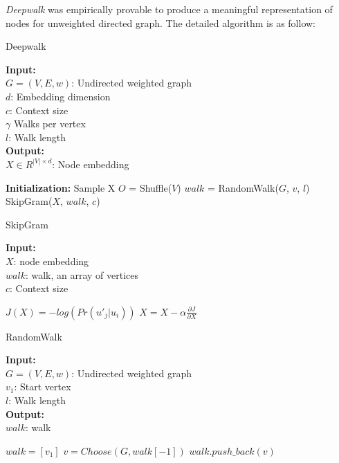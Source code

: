\emph{Deepwalk} \cite{perozzi2014deepwalk} was empirically provable to produce a meaningful representation of nodes for unweighted directed graph. The detailed algorithm is as follow:

\begin{algorithm}[H]
\caption{Deepwalk}
\textbf{Input:}\\
    $G = (V, E, w)$: Undirected weighted graph \\
    $d$: Embedding dimension \\
    $c$: Context size \\
    $\gamma$ Walks per vertex\\
    $l$: Walk length\\

\textbf{Output:}\\
    $X \in R^{|V| \times d}$: Node embedding\\

\begin{algorithmic}
\State \textbf{Initialization:} Sample X
    \State $O$ = Shuffle($V$)
        \State $walk$ = RandomWalk($G$, $v$, $l$)
        \State SkipGram($X$, $walk$, $c$)
    \EndFor
\EndFor
\end{algorithmic}
\end{algorithm}

\begin{algorithm}[H]
\caption{SkipGram}
\textbf{Input:}\\
    $X$: node embedding \\
    $walk$: walk, an array of vertices \\
    $c$: Context size \\

\begin{algorithmic}
 
     
        \State $J(X) = -log(Pr(u'_j | u_i))$
        \State $X = X - \alpha \frac{\partial J}{\partial X}$
        
    \EndFor
\EndFor
\end{algorithmic}
\end{algorithm}

\begin{algorithm}[H]
\caption{RandomWalk}
\textbf{Input:}\\
    $G = (V, E, w)$: Undirected weighted graph \\
    $v_1$: Start vertex \\
    $l$: Walk length\\

\textbf{Output:}\\
    $walk$: walk\\

\begin{algorithmic}
\State $walk = [v_1]$
    \State $v = Choose(G, walk[-1])$ 
    \State $walk.push\_back(v)$
\EndWhile
\end{algorithmic}
\end{algorithm}

